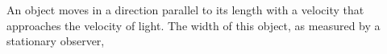 An object moves in a direction parallel to its length with a velocity 
that approaches the velocity of light. 
The width of this object, as measured by a stationary observer,